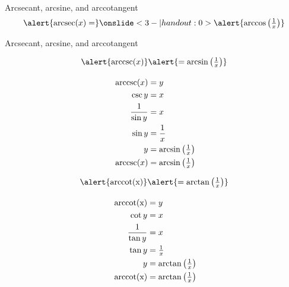 \begin{frame}[t]{Arcsecant, arcsine, and arccotangent}\color{C1}
\[\alert{\text{arcsec}(x)=}\onslide<3-|handout:0>{\alert{\arccos\left(\tfrac1x\right)}}\]\pause
{}

\end{frame}

\begin{frame}[t]{Arcsecant, arcsine, and arccotangent}
\vspace{-1cm}
\begin{multicols}{2}
\color{C2}
\begin{align*}
\alert{\text{arccsc}(x)}&\alert{=\arcsin\left(\tfrac1x\right)}\\[1em]
\text{arccsc}(x)&=y\\
\csc y &= x\\
\frac{1}{\sin y}&=x\\
\sin y &= \frac1x\\
y&=\arcsin\left(\tfrac1x\right)\\
\text{arccsc}(x)&=\arcsin\left(\tfrac1x\right)
\end{align*}\columnbreak


\color{C3}
\begin{align*}
\alert{\text{arccot(x)}}&\alert{=\arctan\left( \tfrac{1}{x}\right)}\\[1em]
\text{arccot(x)}&=y\\
\cot y &= x\\
\frac{1}{\tan y}&=x\\
\tan y &= \tfrac1x\\
y&=\arctan\left(\tfrac1x\right)\\
\text{arccot(x)}&=\arctan\left(\tfrac1x\right)
\end{align*}
\end{multicols}

\end{frame}

